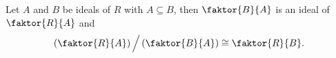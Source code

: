 \begin{thm}
\label{thm:third_isomorphism_theorem_for_rings}
  Let $A$ and $B$ be ideals of $R$ with $A \subseteq B$, then $\faktor{B}{A}$ is an ideal of $\faktor{R}{A}$ and
  \begin{equation*}
    \left(\faktor{R}{A}\right)\Big/\left(\faktor{B}{A}\right) \cong \faktor{R}{B}.
  \end{equation*}
\end{thm}



